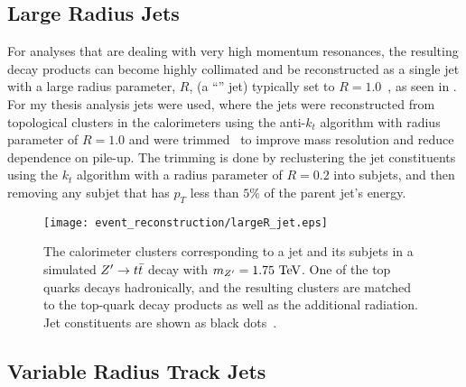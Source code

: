 \subsection{Large Radius Jets}\label{subsection:largeR_jets}

For analyses that are dealing with very high momentum resonances, the resulting decay products can become highly collimated and be reconstructed as a single jet with a large radius parameter, $R$, (a ``\largeR{}'' jet) typically set to $R=1.0$~\cite{JETM-2018-02,SUSY-2016-13}, as seen in .
For my thesis analysis \largeR{} jets were used, where the \largeR{} jets were reconstructed from topological clusters in the calorimeters using the anti-$k_{t}$ algorithm with radius parameter of $R=1.0$ and were trimmed~\cite{Krohn:2009th} to improve mass resolution and reduce dependence on pile-up.
The trimming is done by reclustering the \largeR{} jet constituents using the $k_{t}$ algorithm with a radius parameter of $R=0.2$ into subjets, and then removing any subjet that has $p_{T}$ less than $5\%$ of the \largeR{} parent jet's energy.

\begin{figure}
 \centering
 \texttt{[image: event\_reconstruction/largeR\_jet.eps]}
 \caption[The calorimeter clusters corresponding to a \largeR{} jet and its subjets in a simulated $\Zprime \to t\bar{t}$ decay with $m_{\Zprime}=1.75~\TeV$.]{%
  The calorimeter clusters corresponding to a \largeR{} jet and its subjets in a simulated $\Zprime \to t\bar{t}$ decay with $m_{\Zprime}=1.75~\TeV$.
  One of the top quarks decays hadronically, and the resulting clusters are matched to the top-quark decay products as well as the additional radiation.
  Jet constituents are shown as black dots~\cite{ATLAS-CONF-2014-003,Schwienhorst:2016efd}.}
 \label{fig:largeR_jet}
\end{figure}

\subsection{Variable Radius Track Jets}\label{subsection:VR_jets}

